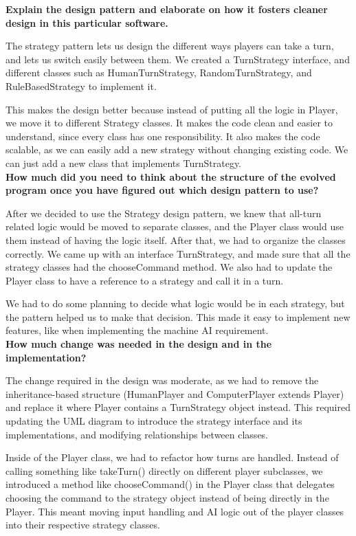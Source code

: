 \textbf{Explain the design pattern and elaborate on how it fosters cleaner design in this
particular software.}

The strategy pattern lets us design the different ways players can take a turn, and lets us switch easily between them. We created a TurnStrategy interface, and different classes such as HumanTurnStrategy, RandomTurnStrategy, and RuleBasedStrategy to implement it.

This makes the design better because instead of putting all the logic in Player, we move it to different Strategy classes. It makes the code clean and easier to understand, since every class has one responsibility. It also makes the code scalable, as we can easily add a new strategy without changing existing code. We can just add a new class that implements TurnStrategy.
\\

\textbf{How much did you need to think about the structure of the evolved program once you have figured out which design pattern to use?}

After we decided to use the Strategy design pattern, we knew that all-turn related logic would be moved to separate classes, and the Player class would use them instead of having the logic itself. After that, we had to organize the classes correctly. We came up with an interface TurnStrategy, and made sure that all the strategy classes had the chooseCommand method. We also had to update the Player class to have a reference to a strategy and call it in a turn. 

We had to do some planning to decide what logic would be in each strategy, but the pattern helped us to make that decision. This made it easy to implement new features, like when implementing the machine AI requirement.
\\

\textbf{How much change was needed in the design and in the implementation?}

The change required in the design was moderate, as we had to remove the inheritance-based structure (HumanPlayer and ComputerPlayer extends Player) and replace it where Player contains a TurnStrategy object instead. This required updating the UML diagram to introduce the strategy interface and its implementations, and modifying relationships between classes.

Inside of the Player class, we had to refactor how turns are handled. Instead of calling something like takeTurn() directly on different player subclasses, we introduced a method like chooseCommand() in the Player class that delegates choosing the command to the strategy object instead of being directly in the Player. This meant moving input handling and AI logic out of the player classes into their respective strategy classes.

